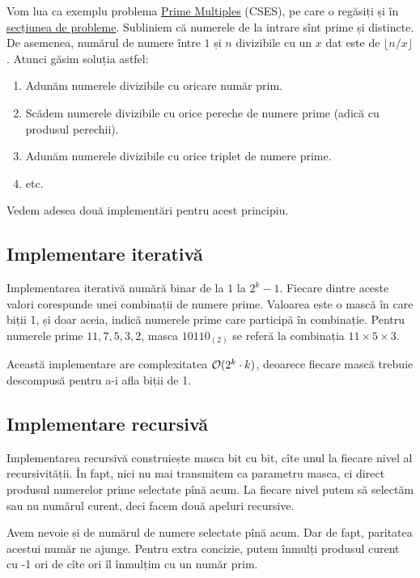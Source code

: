 \documentclass[../main.tex]{subfiles}
\begin{document}
Vom lua ca exemplu problema \href{https://cses.fi/problemset/task/2185}{Prime Multiples} (CSES), pe care o regăsiți și în \hyperref[problem:prime-multiples]{secțiunea de probleme}. Subliniem că numerele de la intrare sînt prime și distincte. De asemenea, numărul de numere între $1$ și $n$ divizibile cu un $x$ dat este de $\lfloor n/x \rfloor$. Atunci găsim soluția astfel:

\begin{enumerate}
  \item Adunăm numerele divizibile cu oricare număr prim.

  \item Scădem numerele divizibile cu orice pereche de numere prime (adică cu produsul perechii).

  \item Adunăm numerele divizibile cu orice triplet de numere prime.

  \item etc.
\end{enumerate}

Vedem adesea două implementări pentru acest principiu.

\subsection{Implementare iterativă}

Implementarea iterativă numără binar de la $1$ la $2^k - 1$. Fiecare dintre aceste valori corespunde unei combinații de numere prime. Valoarea este o mască în care biții 1, și doar aceia, indică numerele prime care participă în combinație. Pentru numerele prime $11, 7, 5, 3, 2$, masca $10110_{(2)}$ se referă la combinația $11 \times 5 \times 3$.

Această implementare are complexitatea  $\mathcal{O}(2^k \cdot k)$, deoarece fiecare mască trebuie descompusă pentru a-i afla biții de 1.

\subsection{Implementare recursivă}

Implementarea recursivă construiește masca bit cu bit, cîte unul la fiecare nivel al recursivității. În fapt, nici nu mai transmitem ca parametru masca, ci direct produsul numerelor prime selectate pînă acum. La fiecare nivel putem să selectăm sau nu numărul curent, deci facem două apeluri recursive.

Avem nevoie și de numărul de numere selectate pînă acum. Dar de fapt, paritatea acestui număr ne ajunge. Pentru extra concizie, putem înmulți produsul curent cu -1 ori de cîte ori îl înmulțim cu un număr prim.
\end{document}
